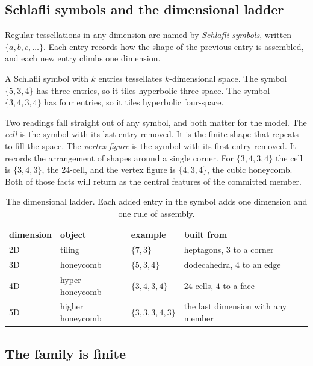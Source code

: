 \subsection{Schlafli symbols and the dimensional ladder}

Regular tessellations in any dimension are named by \emph{Schlafli symbols}, written $\{a, b, c, \dots\}$. Each entry records how the shape of the previous entry is assembled, and each new entry climbs one dimension.

\begin{principle}
A Schlafli symbol with $k$ entries tessellates $k$-dimensional space. The symbol $\{5,3,4\}$ has three entries, so it tiles hyperbolic three-space. The symbol $\{3,4,3,4\}$ has four entries, so it tiles hyperbolic four-space.
\end{principle}

Two readings fall straight out of any symbol, and both matter for the model. The \emph{cell} is the symbol with its last entry removed. It is the finite shape that repeats to fill the space. The \emph{vertex figure} is the symbol with its first entry removed. It records the arrangement of shapes around a single corner. For $\{3,4,3,4\}$ the cell is $\{3,4,3\}$, the 24-cell, and the vertex figure is $\{4,3,4\}$, the cubic honeycomb. Both of those facts will return as the central features of the committed member.

\begin{table}[ht]
\centering
\begin{tabular}{@{}llll@{}}
\toprule
dimension & object & example & built from \\
\midrule
2D & tiling & $\{7,3\}$ & heptagons, $3$ to a corner \\
3D & honeycomb & $\{5,3,4\}$ & dodecahedra, $4$ to an edge \\
4D & hyper-honeycomb & $\{3,4,3,4\}$ & 24-cells, $4$ to a face \\
5D & higher honeycomb & $\{3,3,3,4,3\}$ & the last dimension with any member \\
\bottomrule
\end{tabular}
\caption{The dimensional ladder. Each added entry in the symbol adds one dimension and one rule of assembly.}
\label{tab:dimensional-ladder}
\end{table}

\subsection{The family is finite}

